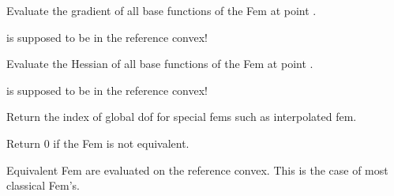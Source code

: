 \documentclass[a4paper,11pt,english]{sphinxmanual}
\begin{document}
\begin{fulllineitems}
\begin{fulllineitems}
\label{\detokenize{python/cmdref_Fem:getfem.Fem.grad_base_value}}
Evaluate the gradient of all base functions of the Fem at point .

 is supposed to be in the reference convex!

\end{fulllineitems}


\begin{fulllineitems}
\label{\detokenize{python/cmdref_Fem:getfem.Fem.hess_base_value}}
Evaluate the Hessian of all base functions of the Fem at point .

 is supposed to be in the reference convex!

\end{fulllineitems}


\begin{fulllineitems}
\label{\detokenize{python/cmdref_Fem:getfem.Fem.index_of_global_dof}}
Return the index of global dof for special fems such as interpolated fem.

\end{fulllineitems}


\begin{fulllineitems}
\label{\detokenize{python/cmdref_Fem:getfem.Fem.is_equivalent}}
Return 0 if the Fem is not equivalent.

Equivalent Fem are evaluated on the reference convex. This is
the case of most classical Fem’s.

\end{fulllineitems}



\end{fulllineitems}
\end{document}
